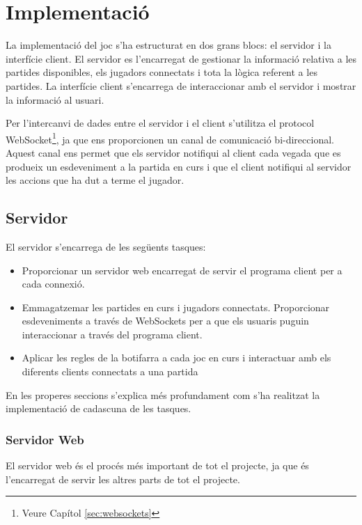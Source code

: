 \chapter{Implementació}
\label{chap:implementacio}

La implementació del joc s'ha estructurat en dos grans blocs: el servidor i la interfície client. El servidor es l'encarregat de gestionar la informació relativa a les partides disponibles, els jugadors connectats i tota la lògica referent a les partides. La interfície client s'encarrega de interaccionar amb el servidor i mostrar la informació al usuari. 

Per l'intercanvi de dades entre el servidor i el client s'utilitza el protocol WebSocket\footnote{Veure Capítol \ref{sec:websockets}},  ja que ens proporcionen un canal de comunicació bi-direccional. Aquest canal ens permet que els servidor notifiqui al client cada vegada que es produeix un esdeveniment a la partida en curs i que el client notifiqui al servidor les accions que ha dut a terme el jugador. 

\section{Servidor}

El servidor s'encarrega de les següents tasques: 

\begin{itemize}
\item{Proporcionar un servidor web encarregat de servir el programa client per a cada connexió.}
\item{Emmagatzemar les partides en curs i jugadors connectats. Proporcionar esdeveniments a través de WebSockets per a que els usuaris puguin interaccionar a través del programa client. }
\item{Aplicar les regles de la botifarra a cada joc en curs i interactuar amb els diferents clients connectats a una partida}
\end{itemize}

En les properes seccions s'explica més profundament com s'ha realitzat la implementació de cadascuna de les tasques. 

\subsection{Servidor Web}

El servidor web és el procés més important de tot el projecte, ja que és l'encarregat de servir les altres parts de tot el projecte. 

